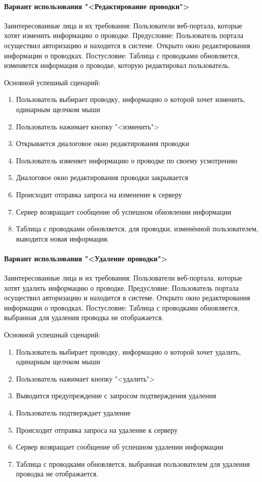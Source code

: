\paragraph{Вариант использования "<Редактирование проводки">}
Заинтересованные лица и их требования: Пользователи веб-портала, которые хотят изменить информацию о проводке.
Предусловие: Пользователь портала осуществил авторизацию и находится в системе. Открыто окно редактирования информации о проводках.
Постусловие: Таблица с проводками обновляется, изменяется информация о проводке, которую редактировал пользователь.

Основной успешный сценарий:
\begin{enumerate}
	\item Пользователь выбирает проводку, информацию о которой хочет изменить, одинарным щелчком мыши
	\item Пользователь нажимает кнопку "<изменить">
	\item Открывается диалоговое окно редактирования проводки
	\item Пользователь изменяет информацию о проводке по своему усмотрению
	\item Диалоговое окно редактирования проводки закрывается
	\item Происходит отправка запроса на изменение к серверу 
	\item Сервер возвращает сообщение об успешном обновлении информации
	\item Таблица с проводками обновляется, для проводки, изменённой пользователем, выводится новая информация.
\end{enumerate}

\paragraph{Вариант использования "<Удаление проводки">}
Заинтересованные лица и их требования: Пользователи веб-портала, которые хотят удалить информацию о проводке.
Предусловие: Пользователь портала осуществил авторизацию и находится в системе. Открыто окно редактирования информации о проводках.
Постусловие: Таблица с проводками обновляется, выбранная для удаления проводка не отображается.

Основной успешный сценарий:
\begin{enumerate}
	\item Пользователь выбирает проводку, информацию о которой хочет удалить, одинарным щелчком мыши
	\item Пользователь нажимает кнопку "<удалить">
	\item Выводится предупреждение с запросом подтверждения удаления
	\item Пользователь подтверждает удаление
	\item Происходит отправка запроса на удаление к серверу 
	\item Сервер возвращает сообщение об успешном удалении информации
	\item Таблица с проводками обновляется, выбранная пользователем для удаления проводка не отображается.
\end{enumerate}

